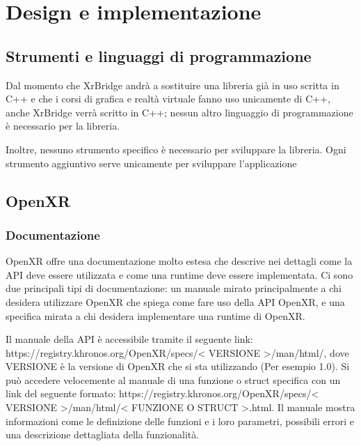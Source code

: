 \documentclass[twoside]{supsistudent}
\begin{document}
\chapter{Design e implementazione}


\section{Strumenti e linguaggi di programmazione}

Dal momento che XrBridge andrà a sostituire una libreria già in uso scritta in C++ e che i corsi di grafica e realtà virtuale fanno uso unicamente di C++, anche XrBridge verrà scritto in C++; nessun altro linguaggio di programmazione è necessario per la libreria.

Inoltre, nessuno strumento specifico è necessario per sviluppare la libreria. Ogni strumento aggiuntivo serve unicamente per sviluppare l'applicazione


\section{OpenXR}

\subsection{Documentazione}

OpenXR offre una documentazione molto estesa che descrive nei dettagli come la API deve essere utilizzata e come una runtime deve essere implementata. Ci sono due principali tipi di documentazione: un manuale mirato principalmente a chi desidera utilizzare OpenXR che spiega come fare uso della API OpenXR, e una specifica mirata a chi desidera implementare una runtime di OpenXR.

Il manuale della API è accessibile tramite il seguente link: https://registry.khronos.org/OpenXR/specs/< VERSIONE >/man/html/, dove VERSIONE è la versione di OpenXR che si sta utilizzando (Per esempio 1.0). Si può accedere velocemente al manuale di una funzione o struct specifica con un link del seguente formato: https://registry.khronos.org/OpenXR/specs/< VERSIONE >/man/html/< FUNZIONE O STRUCT >.html. Il manuale mostra informazioni come le definizione delle funzioni e i loro parametri, possibili errori e una descrizione dettagliata della funzionalità.
\end{document}
